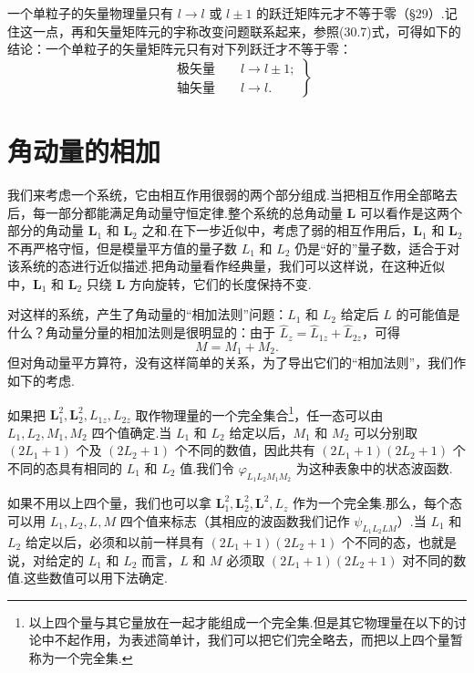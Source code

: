 一个单粒子的矢量物理量只有 $l\longrightarrow l$ 或 $l\pm1$ 的跃迁矩阵元才不等于零（§29）.记住这一点，再和矢量矩阵元的宇称改变问题联系起来，参照(30.7)式，可得如下的结论：一个单粒子的矢量矩阵元只有对下列跃迁才不等于零：
\begin{equation}
\left.\begin{aligned}
  &\text{极矢量}\qquad l\longrightarrow l\pm1;\\
  &\text{轴矢量}\qquad l\longrightarrow l.
\end{aligned}\right\}
\end{equation}

\section{角动量的相加}

我们来考虑一个系统，它由相互作用很弱的两个部分组成.当把相互作用全部略去后，每一部分都能满足角动量守恒定律.整个系统的总角动量 $\boldsymbol{L}$ 可以看作是这两个部分的角动量 $\boldsymbol{L}_1$ 和 $\boldsymbol{L}_2$ 之和.在下一步近似中，考虑了弱的相互作用后，$\boldsymbol{L}_1$ 和 $\boldsymbol{L}_2$ 不再严格守恒，但是模量平方值的量子数 $L_1$ 和 $L_2$ 仍是“好的”量子数，适合于对该系统的态进行近似描述.把角动量看作经典量，我们可以这样说，在这种近似中，$\boldsymbol{L}_1$ 和 $\boldsymbol{L}_2$ 只绕 $\boldsymbol{L}$ 方向旋转，它们的长度保持不变.

对这样的系统，产生了角动量的“相加法则”问题：$L_1$ 和 $L_2$ 给定后 $L$ 的可能值是什么？角动量分量的相加法则是很明显的：由于 $\hat{L}_z=\hat{L}_{1z}+\hat{L}_{2z}$，可得
\begin{equation}
  M=M_1+M_2.
\end{equation}
但对角动量平方算符，没有这样简单的关系，为了导出它们的“相加法则”，我们作如下的考虑.

如果把 $\boldsymbol{L}_1^2,\boldsymbol{L}_2^2,L_{1z},L_{2z}$ 取作物理量的一个完全集合\footnote{以上四个量与其它量放在一起才能组成一个完全集.但是其它物理量在以下的讨论中不起作用，为表述简单计，我们可以把它们完全略去，而把以上四个量暂称为一个完全集.}，任一态可以由 $L_1,L_2,M_1,M_2$ 四个值确定.当 $L_1$ 和 $L_2$ 给定以后，$M_1$ 和 $M_2$ 可以分别取 $(2L_1+1)$ 个及 $(2L_2+1)$ 个不同的数值，因此共有 $(2L_1+1)(2L_2+1)$ 个不同的态具有相同的 $L_1$ 和 $L_2$ 值.我们令 $\varphi_{L_1L_2M_1M_2}$ 为这种表象中的状态波函数.

如果不用以上四个量，我们也可以拿 $\boldsymbol{L}_1^2,\boldsymbol{L}_2^2,\boldsymbol{L}^2,L_z$ 作为一个完全集.那么，每个态可以用 $L_1,L_2,L,M$ 四个值来标志（其相应的波函数我们记作 $\psi_{L_1L_2LM}$）.当 $L_1$ 和 $L_2$ 给定以后，必须和以前一样具有 $(2L_1+1)(2L_2+1)$ 个不同的态，也就是说，对给定的 $L_1$ 和 $L_2$ 而言，$L$ 和 $M$ 必须取 $(2L_1+1)(2L_2+1)$ 对不同的数值.这些数值可以用下法确定.

